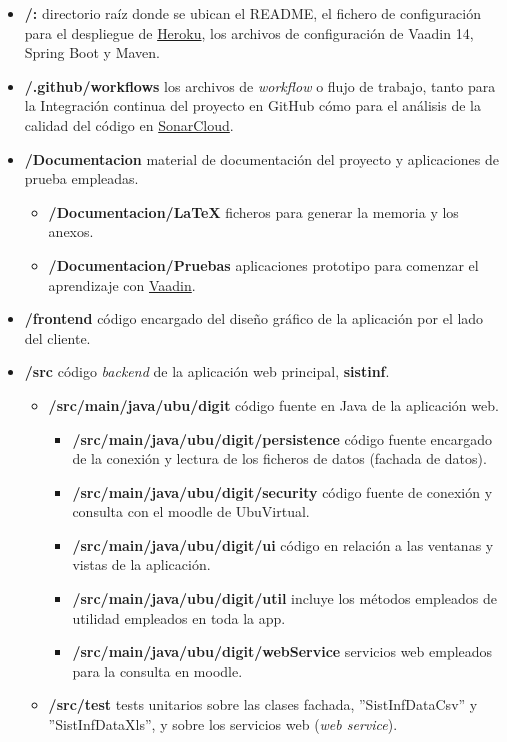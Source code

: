 \begin{itemize}
	\item \textbf{/:} directorio raíz donde se ubican el README, el fichero de configuración para el despliegue de \href{https://dashboard.heroku.com/}{Heroku}, los archivos de configuración de Vaadin 14, Spring Boot y Maven. 
	\item \textbf{/.github/workflows} los archivos de \textit{workflow} o flujo de trabajo, tanto para la Integración continua del proyecto en GitHub cómo para el análisis de la calidad del código en \href{https://sonarcloud.io/}{SonarCloud}.
	\item \textbf{/Documentacion} material de documentación del proyecto y aplicaciones de prueba empleadas.
		\begin{itemize}
			\tightlist
			\item \textbf{/Documentacion/LaTeX} ficheros para generar la memoria y los anexos.
			\item \textbf{/Documentacion/Pruebas} aplicaciones prototipo para comenzar el aprendizaje con \href{https://vaadin.com/}{Vaadin}.
		\end{itemize}
	\item \textbf{/frontend} código encargado del diseño gráfico de la aplicación por el lado del cliente.
	\item \textbf{/src} código \textit{backend} de la aplicación web principal, \textbf{sistinf}.
	\begin{itemize}
		\tightlist
		\item \textbf{/src/main/java/ubu/digit} código fuente en Java de la aplicación web.
			\begin{itemize}
				\item \textbf{/src/main/java/ubu/digit/persistence} código fuente encargado de la conexión y lectura de los ficheros de datos (fachada de datos).
				\item \textbf{/src/main/java/ubu/digit/security} código fuente de conexión y consulta con el moodle de UbuVirtual.
				\item \textbf{/src/main/java/ubu/digit/ui} código en relación a las ventanas y vistas de la aplicación.
				\item \textbf{/src/main/java/ubu/digit/util} incluye los métodos empleados de utilidad empleados en toda la app. 
				\item \textbf{/src/main/java/ubu/digit/webService} servicios web empleados para la consulta en moodle.
			\end{itemize}
		\item \textbf{/src/test} tests unitarios sobre las clases fachada, ''SistInfDataCsv'' y ''SistInfDataXls'', y sobre los servicios web (\emph{web service}).
	\end{itemize}
\end{itemize}


